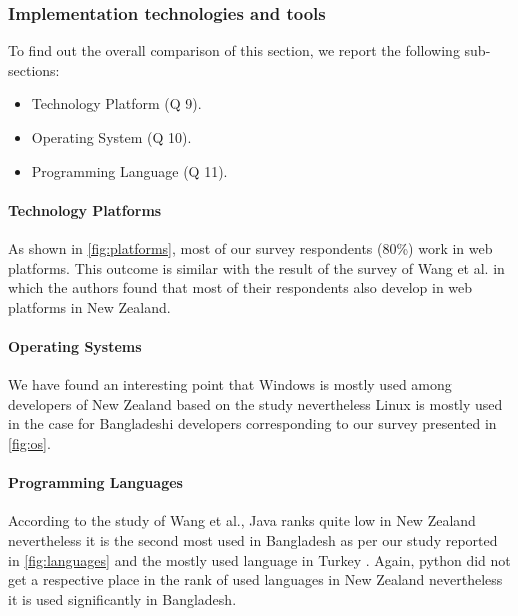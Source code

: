 \subsubsection{Implementation technologies and tools}
\label{implementaion_techonologies_comparison}

To find out the overall comparison of this section, we report the following sub-sections:
\begin{itemize}
\item Technology Platform (Q 9).
\item Operating System (Q 10).
\item Programming Language (Q 11).
\end{itemize}


\paragraph{Technology Platforms}
As shown in \ref{fig:platforms}, most of our survey respondents (80\%) work in web platforms. This outcome is similar with the result of the survey of Wang et al. \cite{Wang2018} in which the authors found that most of their respondents also develop in web platforms in New Zealand.


\paragraph{Operating Systems}
We have found an interesting point that Windows is mostly used among developers of New Zealand based on the study \cite{Wang2018} nevertheless Linux is mostly used in the case for Bangladeshi developers corresponding to our survey presented in \ref{fig:os}.


\paragraph{Programming Languages}
According to the study of Wang et al.\cite{Wang2018}, Java ranks quite low in New Zealand nevertheless it is the second most used in Bangladesh as per our study reported in \ref{fig:languages} and the mostly used language in Turkey \cite{Garousi2015}. Again, python did not get a respective place in the rank of used languages in New Zealand nevertheless it is used significantly in Bangladesh.
